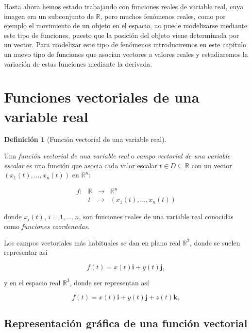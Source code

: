\documentclass[
  a4paper,
]{scrreport}
\theoremstyle{definition}
\theoremstyle{plain}
\theoremstyle{plain}
\theoremstyle{plain}
\theoremstyle{definition}
\newtheorem{definition}{Definición}[chapter]
\theoremstyle{remark}
\begin{document}
Hasta ahora hemos estado trabajando con funciones reales de variable
real, cuya imagen era un subconjunto de \(\mathbb{R}\), pero muchos
fenómenos reales, como por ejemplo el movimiento de un objeto en el
espacio, no puede modelizarse mediante este tipo de funciones, puesto
que la posición del objeto viene determinada por un vector. Para
modelizar este tipo de fenómenos introduciremos en este capítulo un
nuevo tipo de funciones que asocian vectores a valores reales y
estudiaremos la variación de estas funciones mediante la derivada.

\hypertarget{funciones-vectoriales-de-una-variable-real}{%
\section{Funciones vectoriales de una variable
real}\label{funciones-vectoriales-de-una-variable-real}}

\begin{definition}[Función vectorial de una variable
real]\protect\hypertarget{def-funcion-vectorial}{}\label{def-funcion-vectorial}

Una \emph{función vectorial de una variable real} o \emph{campo
vectorial de una variable escalar} es una función que asocia cada valor
escalar \(t\in D\subseteq \mathbb{R}\) con un vector
\((x_1(t),\ldots,x_n(t))\) en \(\mathbb{R}^n\):

\[
\begin{array}{rccl}
f: & \mathbb{R} & \longrightarrow & \mathbb{R}^n \\
& t & \longrightarrow & (x_1(t),\ldots, x_n(t))
\end{array}
\]

donde \(x_i(t)\), \(i=1,\ldots,n\), son funciones reales de una variable
real conocidas como \emph{funciones coordenadas}.

\end{definition}

Los campos vectoriales más habituales se dan en plano real
\(\mathbb{R}^2\), donde se suelen representar así

\[
f(t) = x(t)\mathbf{i}+y(t)\mathbf{j},
\]

y en el espacio real \(\mathbb{R}^3\), donde ser representan así

\[
f(t) = x(t)\mathbf{i}+y(t)\mathbf{j}+z(t)\mathbf{k},
\]

\hypertarget{representaciuxf3n-gruxe1fica-de-una-funciuxf3n-vectorial}{%
\subsection{Representación gráfica de una función
vectorial}\label{representaciuxf3n-gruxe1fica-de-una-funciuxf3n-vectorial}}
\end{document}

